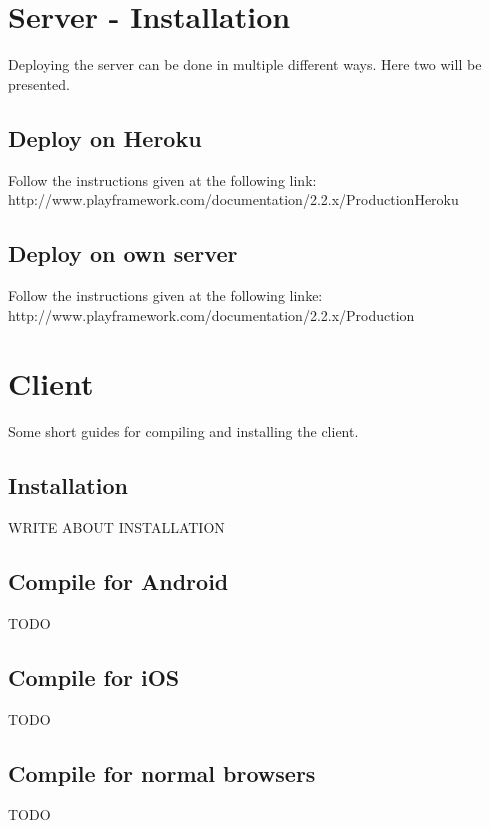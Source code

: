 \documentclass[11pt]{book}
\begin{document}
\section{Server - Installation}
Deploying the server can be done in multiple different ways. Here two will be presented.

\subsection{Deploy on Heroku}
Follow the instructions given at the following link:\\
http://www.playframework.com/documentation/2.2.x/ProductionHeroku

\subsection{Deploy on own server}
Follow the instructions given at the following linke:\\
http://www.playframework.com/documentation/2.2.x/Production

\section{Client}
Some short guides for compiling and installing the client.

\subsection{Installation}
WRITE ABOUT INSTALLATION

\subsection{Compile for Android}
TODO

\subsection{Compile for iOS}
TODO

\subsection{Compile for normal browsers}
TODO
\end{document}

